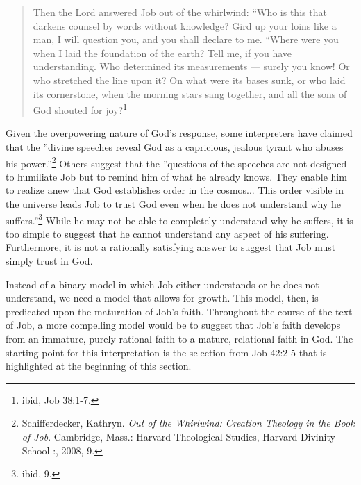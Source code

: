         

\begin{quote}
Then the Lord answered Job out of the whirlwind: ``Who is this that darkens counsel by words without knowledge? Gird up your loins like a man, I will question you, and you shall declare to me. ``Where were you when I laid the foundation of the earth? Tell me, if you have understanding. Who determined its measurements --- surely you know! Or who stretched the line upon it? On what were its bases sunk, or who laid its cornerstone, when the morning stars sang together, and all the sons of God shouted for joy?\footnote{ibid, Job 38:1-7.}
\end{quote}

Given the overpowering nature of God's response, some interpreters have claimed that the ''divine speeches reveal God as a capricious, jealous tyrant who abuses his power.''\footnote{Schifferdecker, Kathryn. \emph{Out of the Whirlwind: Creation Theology in the Book of Job}. Cambridge, Mass.: Harvard Theological Studies, Harvard Divinity School :, 2008, 9.} Others suggest that the ''questions of the speeches are not designed to humiliate Job but to remind him of what he already knows. They enable him to realize anew that God establishes order in the cosmos... This order visible in the universe leads Job to trust God even when he does not understand why he suffers.''\footnote{ibid, 9.} While he may not be able to completely understand why he suffers, it is too simple to suggest that he cannot understand any aspect of his suffering. Furthermore, it is not a rationally satisfying answer to suggest that Job must simply trust in God.

Instead of a binary model in which Job either understands or he does not understand, we need a model that allows for growth. This model, then, is predicated upon the maturation of Job's faith. Throughout the course of the text of Job, a more compelling model would be to suggest that Job's faith develops from an immature, purely rational faith to a mature, relational faith in God. The starting point for this interpretation is the selection from Job 42:2-5 that is highlighted at the beginning of this section.

